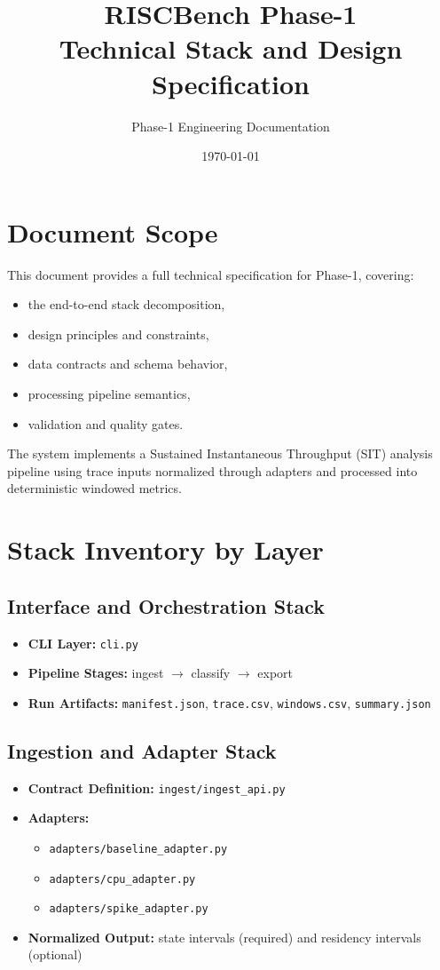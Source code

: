 \documentclass[11pt,a4paper]{article}
\title{RISCBench Phase-1\\Technical Stack and Design Specification}
\author{Phase-1 Engineering Documentation}
\date{\today}
\begin{document}
\maketitle
\tableofcontents
\newpage

\section{Document Scope}
This document provides a full technical specification for Phase-1, covering:
\begin{itemize}[leftmargin=1.4em]
  \item the end-to-end stack decomposition,
  \item design principles and constraints,
  \item data contracts and schema behavior,
  \item processing pipeline semantics,
  \item validation and quality gates.
\end{itemize}

The system implements a Sustained Instantaneous Throughput (SIT) analysis pipeline using trace inputs normalized through adapters and processed into deterministic windowed metrics.

\section{Stack Inventory by Layer}
\subsection{Interface and Orchestration Stack}
\begin{itemize}[leftmargin=1.4em]
  \item \textbf{CLI Layer:} \texttt{cli.py}
  \item \textbf{Pipeline Stages:} ingest $\rightarrow$ classify $\rightarrow$ export
  \item \textbf{Run Artifacts:} \texttt{manifest.json}, \texttt{trace.csv}, \texttt{windows.csv}, \texttt{summary.json}
\end{itemize}

\subsection{Ingestion and Adapter Stack}
\begin{itemize}[leftmargin=1.4em]
  \item \textbf{Contract Definition:} \texttt{ingest/ingest\_api.py}
  \item \textbf{Adapters:}
  \begin{itemize}
    \item \texttt{adapters/baseline\_adapter.py}
    \item \texttt{adapters/cpu\_adapter.py}
    \item \texttt{adapters/spike\_adapter.py}
  \end{itemize}
  \item \textbf{Normalized Output:} state intervals (required) and residency intervals (optional)
\end{itemize}
\end{document}
